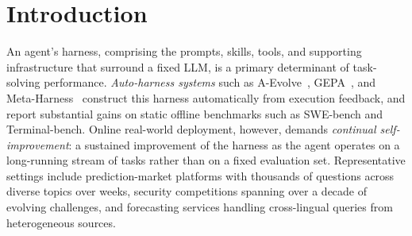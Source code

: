 





\section{Introduction}
\label{sec:intro}

An agent's harness, comprising the prompts, skills, tools, and supporting infrastructure that surround a fixed LLM, is a primary determinant of task-solving performance. \emph{Auto-harness systems} such as A-Evolve~\cite{}, GEPA~\cite{}, and Meta-Harness~\cite{} construct this harness automatically from execution feedback, and report substantial gains on static offline benchmarks such as SWE-bench and Terminal-bench. Online real-world deployment, however, demands \emph{continual self-improvement}: a sustained improvement of the harness as the agent operates on a long-running stream of tasks rather than on a fixed evaluation set. 
Representative settings include prediction-market platforms with thousands of questions across diverse topics over weeks, security competitions spanning over a decade of evolving challenges, and forecasting services handling cross-lingual queries from heterogeneous sources.

